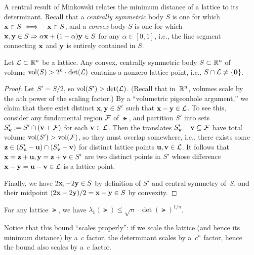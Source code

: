 \documentclass[11pt]{article}
\begin{document}
A central result of Minkowski relates the minimum distance of a
lattice to its determinant.  Recall that a \emph{centrally symmetric}
body $S$ is one for which $\mathbf{x} \in S \iff -\mathbf{x} \in S$, and a
\emph{convex} body $S$ is one for which $\mathbf{x}, \mathbf{y} \in S
\Rightarrow \alpha \mathbf{x} + (1-\alpha) \mathbf{y} \in S$ for any $\alpha \in
[0,1]$, i.e., the line segment connecting $\mathbf{x}$ and $\mathbf{y}$ is
entirely contained in $S$.

\begin{theorem}[Minkowski]
  \label{thm:minkowski-body}
  Let $\mathcal{L} \subset \mathbb{R}^{n}$ be a lattice. Any convex, centrally
  symmetric body $S \subset \mathbb{R}^{n}$ of volume
  $\operatorname{vol}(S) > 2^n \cdot \det(\mathcal{L})$ contains a nonzero lattice point,
  i.e., $S \cap \mathcal{L} \neq \{\mathbf{0}\}$.
\end{theorem}

\begin{proof}
  Let $S'=S/2$, so $\operatorname{vol}(S') > \det(\mathcal{L})$. (Recall that in~$\mathbb{R}^{n}$,
  volumes scale by the $n$th power of the scaling factor.) By a
  ``volumetric pigeonhole argument,'' we claim that there exist
  distinct $\mathbf{x}, \mathbf{y} \in S'$ such that $\mathbf{x}-\mathbf{y} \in \mathcal{L}$. To
  see this, consider any fundamental region $\mathcal{F}$ of $\lat$, and
  partition $S'$ into sets $S'_{\mathbf{v}} := S' \cap (\mathbf{v} + \mathcal{F})$ for
  each $\mathbf{v} \in \mathcal{L}$. Then the translates
  $S'_{\mathbf{v}} - \mathbf{v} \subseteq \mathcal{F}$ have total volume
  $\operatorname{vol}(S') > \operatorname{vol}(\mathcal{F})$, so they must overlap somewhere, i.e.,
  there exists some
  $\mathbf{z} \in (S'_{\mathbf{u}} - \mathbf{u}) \cap (S'_{\mathbf{v}} - \mathbf{v})$ for
  distinct lattice points $\mathbf{u},\mathbf{v} \in \mathcal{L}$. It follows that
  $\mathbf{x} = \mathbf{z} + \mathbf{u}, \mathbf{y} = \mathbf{z} + \mathbf{v} \in S'$ are two
  distinct points in $S'$ whose difference
  $\mathbf{x}-\mathbf{y} = \mathbf{u}-\mathbf{v} \in \mathcal{L}$ is a lattice point.

  Finally, we have $2\mathbf{x}, -2\mathbf{y}\in S$ by definition of $S'$ and
  central symmetry of~$S$, and their midpoint $(2\mathbf{x}-2\mathbf{y})/2 =
  \mathbf{x}-\mathbf{y}\in S$ by convexity.
\end{proof}

\begin{corollary}
  \label{cor:minkowski-first}
  For any lattice $\lat$, we have $\lambda_1(\lat) \leq \sqrt{n} \cdot
  \det(\lat)^{1/n}$.
\end{corollary}

Notice that this bound ``scales properly'': if we scale the lattice
(and hence its minimum distance) by a~$c$ factor, the determinant
scales by a~$c^{n}$ factor, hence the bound also scales by a~$c$
factor.
\end{document}
